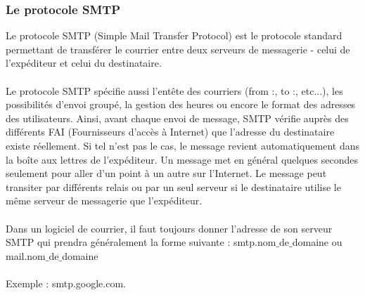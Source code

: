 \documentclass[french]{report}
\begin{document}
\begin{titlepage}
\subsubsection{\LARGE Le protocole SMTP }
\LARGE Le protocole SMTP (Simple Mail Transfer Protocol) est le protocole standard permettant de transférer le courrier entre deux serveurs de messagerie - celui de l'expéditeur et celui du destinataire.\\ \\
Le protocole SMTP spécifie aussi l'entête des courriers (from :, to :, etc...), les possibilités d'envoi groupé, la gestion des heures ou encore le format des adresses des utilisateurs. Ainsi, avant chaque envoi de message, SMTP vérifie auprès des différents FAI (Fournisseurs d'accès à Internet) que l'adresse du destinataire existe réellement. Si tel n'est pas le cas, le message revient automatiquement dans la boîte aux lettres de l'expéditeur.
Un message met en général quelques secondes seulement pour aller d'un point à un autre sur l'Internet. Le message peut transiter par différents relais ou par un seul serveur si le destinataire utilise le même serveur de messagerie que l'expéditeur.\\ \\
Dans un logiciel de courrier, il faut toujours donner l'adresse de son serveur SMTP qui prendra généralement la forme suivante : smtp.nom$\_$de$\_$domaine ou mail.nom$\_$de$\_$domaine\\ \\
Exemple : smtp.google.com.


\end{titlepage}
\end{document}
